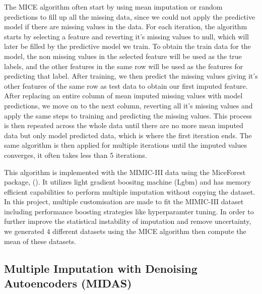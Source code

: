 \documentclass{l4proj}
\begin{document}
The MICE algorithm often start by using mean imputation or random predictions to fill up all the missing data, since we could not apply the predictive model if there are missing values in the data. For each iteration, the algorithm starts by selecting a feature and reverting it's missing values to null, which will later be filled by the predictive model we train. To obtain the train data for the model, the non missing values in the selected feature will be used as the true labels, and the other features in the same row will be used as the features for predicting that label. After training, we then predict the missing values giving it's other features of the same row as test data to obtain our first imputed feature. After replacing an entire column of mean imputed missing values with model predictions, we move on to the next column, reverting all it's missing values and apply the same steps to training and predicting the missing values. This process is then repeated across the whole data until there are no more mean imputed data but only model predicted data, which is where the first iteration ends. The same algorithm is then applied for multiple iterations until the imputed values converges, it often takes less than 5 iterations.

This algorithm is implemented with the MIMIC-III data using the MiceForest package, (\cite{wilson_2022}). It utilizes light gradient boositng machine (Lgbm) and has memory efficient capabilities to perform multiple imputation without copying the dataset. In this project, multiple customisation are made to fit the MIMIC-III dataset including performance boosting strategies like hyperparamter tuning. In order to further improve the statistical instability of imputation and remove uncertainty, we generated 4 different datasets using the MICE algorithm then compute the mean of these datasets. 



\subsection{Multiple Imputation with Denoising Autoencoders (MIDAS)}
\end{document}
